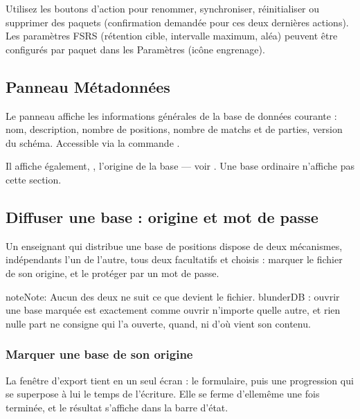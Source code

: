 \documentclass[letterpaper,10pt,french]{sphinxmanual}
\begin{document}
\sphinxAtStartPar
{} Utilisez les boutons d’action pour renommer,
synchroniser, réinitialiser ou supprimer des paquets (confirmation demandée
pour ces deux dernières actions). Les paramètres FSRS (rétention cible,
intervalle maximum, aléa) peuvent être configurés par paquet dans les
Paramètres (icône engrenage).


\subsection{Panneau Métadonnées}
\label{\detokenize{manuel:panneau-metadonnees}}\label{\detokenize{manuel:panneau-metadata}}
\sphinxAtStartPar
Le panneau  affiche les informations générales de la base de
données courante : nom, description, nombre de positions, nombre de matchs et
de parties, version du schéma. Accessible via la commande .

\sphinxAtStartPar
Il affiche également, , l’origine de la base — voir
{\hyperref[\detokenize{manuel:diffusion-controlee}]{}}. Une base ordinaire n’affiche pas cette section.


\subsection{Diffuser une base : origine et mot de passe}
\label{\detokenize{manuel:diffuser-une-base-origine-et-mot-de-passe}}\label{\detokenize{manuel:diffusion-controlee}}
\sphinxAtStartPar
Un enseignant qui distribue une base de positions dispose de deux mécanismes,
indépendants l’un de l’autre, tous deux facultatifs et choisis  : marquer le fichier de son origine, et le protéger par un mot de
passe.

\begin{sphinxadmonition}{note}{Note:}
\sphinxAtStartPar
Aucun des deux ne suit ce que devient le fichier. blunderDB  : ouvrir une base marquée est
exactement comme ouvrir n’importe quelle autre, et rien nulle part ne
consigne qui l’a ouverte, quand, ni d’où vient son contenu.
\end{sphinxadmonition}


\subsubsection{Marquer une base de son origine}
\label{\detokenize{manuel:marquer-une-base-de-son-origine}}
\sphinxAtStartPar
La fenêtre d’export tient en un seul écran : le formulaire, puis une
progression qui se superpose à lui le temps de l’écriture. Elle se ferme
d’elle\sphinxhyphen{}même une fois terminée, et le résultat s’affiche dans la barre d’état.
\end{document}
